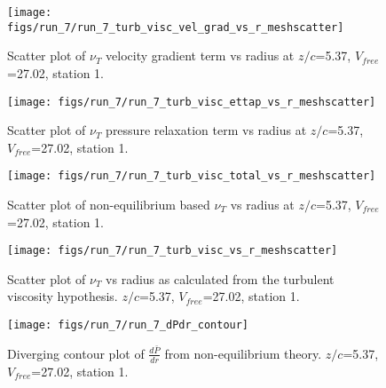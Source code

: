 \begin{figure}[H]
\centering
\texttt{[image: figs/run\_7/run\_7\_turb\_visc\_vel\_grad\_vs\_r\_meshscatter]}
\caption{Scatter plot of $\nu_T$ velocity gradient term vs radius at $z/c$=5.37, $V_{free}$=27.02, station 1.}
\end{figure}


\begin{figure}[H]
\centering
\texttt{[image: figs/run\_7/run\_7\_turb\_visc\_ettap\_vs\_r\_meshscatter]}
\caption{Scatter plot of $\nu_T$ pressure relaxation term vs radius at $z/c$=5.37, $V_{free}$=27.02, station 1.}
\end{figure}


\begin{figure}[H]
\centering
\texttt{[image: figs/run\_7/run\_7\_turb\_visc\_total\_vs\_r\_meshscatter]}
\caption{Scatter plot of non-equilibrium based $\nu_T$ vs radius at $z/c$=5.37, $V_{free}$=27.02, station 1.}
\end{figure}


\begin{figure}[H]
\centering
\texttt{[image: figs/run\_7/run\_7\_turb\_visc\_vs\_r\_meshscatter]}
\caption{Scatter plot of $\nu_T$ vs radius as calculated from the turbulent viscosity hypothesis. $z/c$=5.37, $V_{free}$=27.02, station 1.}
\end{figure}


\begin{figure}[H]
\centering
\texttt{[image: figs/run\_7/run\_7\_dPdr\_contour]}
\caption{Diverging contour plot of $\frac{d\bar{P}}{dr}$ from non-equilibrium theory. $z/c$=5.37, $V_{free}$=27.02, station 1.}
\end{figure}


